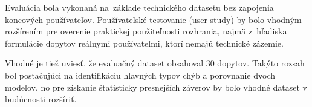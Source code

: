 Evaluácia bola vykonaná na~základe technického datasetu bez zapojenia koncových
používateľov. Používateľské testovanie (user study) by bolo vhodným rozšírením pre
overenie praktickej použiteľnosti rozhrania, najmä z~hľadiska formulácie dopytov
reálnymi používateľmi, ktorí nemajú technické zázemie.

Vhodné je tiež uviesť, že evaluačný dataset obsahoval 30 dopytov. Takýto rozsah bol
postačujúci na identifikáciu hlavných typov chýb a porovnanie dvoch modelov, no
pre získanie štatisticky presnejších záverov by bolo vhodné dataset v budúcnosti
rozšíriť.